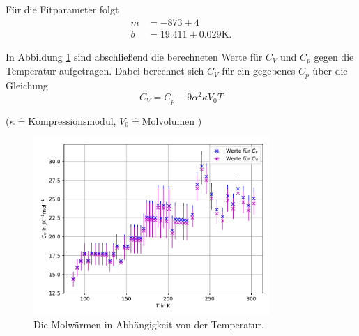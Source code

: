 Für die Fitparameter folgt
\begin{align}
    m &=  -873 \pm 4 \\
    b &=  19.411 \pm 0.029 \si{\kelvin} .
\end{align}

In Abbildung \ref{fig:cvcp} sind abschließend die berechneten Werte für $C_V$ und $C_p$ gegen die Temperatur aufgetragen. Dabei berechnet sich $C_V$ für ein gegebenes $C_p$ über die Gleichung
\begin{equation}
    C_V = C_p - 9 \alpha^2 \kappa V_0 T
\end{equation}
\begin{center}
    \tiny{($\kappa \hat{=} \text{Kompressionsmodul} $, $V_0 \hat{=} \text{Molvolumen} $ )}
\end{center}
\begin{figure}[H]
    \centering
    \includegraphics[width=0.8\textwidth]{data/plots/plot_Cv.pdf}
    \caption{Die Molwärmen in Abhängigkeit von der Temperatur.}
    \label{fig:cvcp}
\end{figure}

